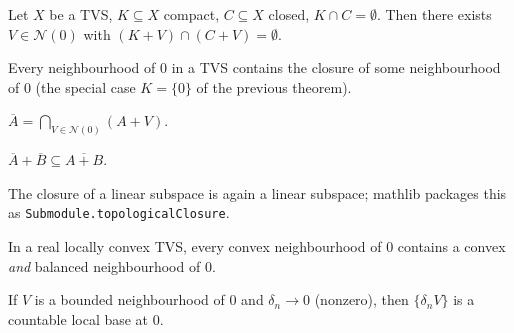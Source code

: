 
\begin{theorem}
  \label{thm:tvs-separation}
  \leanok
  Let $X$ be a TVS, $K \subseteq X$ compact, $C \subseteq X$ closed,
  $K \cap C = \emptyset$. Then there exists $V \in \mathcal N(0)$ with
  $(K + V) \cap (C + V) = \emptyset$.
\end{theorem}

\begin{theorem}
  \label{thm:tvs-regular}
  \leanok
  Every neighbourhood of $0$ in a TVS contains the closure of some
  neighbourhood of $0$ (the special case $K = \{0\}$ of the previous
  theorem).
\end{theorem}

\begin{theorem}
  \label{thm:closure-eq-iInter-add}
  \leanok
  $\overline{A} = \bigcap_{V \in \mathcal N(0)} (A + V)$.
\end{theorem}

\begin{theorem}
  \label{thm:closure-add-subset}
  \leanok
  $\overline{A} + \overline{B} \subseteq \overline{A + B}$.
\end{theorem}

\begin{definition}
  \label{def:submodule-closure}
  \leanok
  The closure of a linear subspace is again a linear subspace; mathlib
  packages this as \texttt{Submodule.topologicalClosure}.
\end{definition}

\begin{theorem}
  \label{thm:convex-balanced-nhd}
  \leanok
  In a real locally convex TVS, every convex neighbourhood of $0$
  contains a convex \emph{and} balanced neighbourhood of $0$.
\end{theorem}

\begin{theorem}
  \label{thm:nhds-basis-smul-bounded}
  \leanok
  If $V$ is a bounded neighbourhood of $0$ and $\delta_n \to 0$
  (nonzero), then $\{\delta_n V\}$ is a countable local base at $0$.
\end{theorem}


